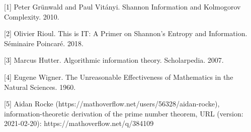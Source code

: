 \documentclass{article}
\begin{document}
\small
[1] Peter Grünwald and Paul Vitányi. Shannon Information and Kolmogorov Complexity. 2010.

[2] Olivier Rioul. This is IT: A Primer on Shannon’s Entropy and Information. Séminaire Poincaré. 2018.

[3] Marcus Hutter. Algorithmic information theory. Scholarpedia. 2007.

[4] Eugene Wigner. The Unreasonable Effectiveness of Mathematics in the Natural Sciences. 1960.

[5] Aidan Rocke (https://mathoverflow.net/users/56328/aidan-rocke), information-theoretic derivation of the prime number theorem, URL (version: 2021-02-20): https://mathoverflow.net/q/384109
\end{document}
